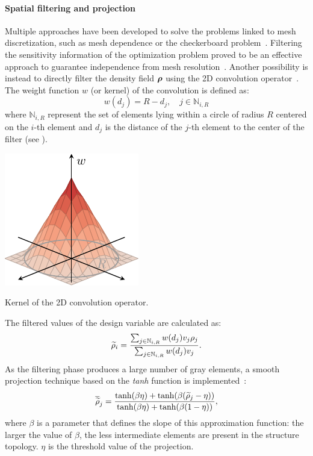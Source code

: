 \paragraph{Spatial filtering and projection} 
Multiple approaches have been developed to solve the problems linked to mesh discretization, such as mesh dependence or the checkerboard problem~. Filtering the sensitivity information of the optimization problem proved to be an effective approach to guarantee independence from mesh resolution~. Another possibility is instead to directly filter the density field $\bm{\rho}$ using the 2D convolution operator~. The weight function $w$ (or kernel) of the convolution is defined as:
\begin{equation}
    w(d_j) = R - d_j, \quad j \in \mathbb{N}_{i,R}
\end{equation} 
where $\mathbb{N}_{i,R}$ represent the set of elements lying within a circle of radius $R$ centered on the $i$-th element and $d_j$ is the distance of the $j$-th element to the center of the filter (see ).
\begin{marginfigure}
    \centering
    \includegraphics{figures/02_literature/02_circ_filter/filt_cir.pdf}
    \caption{Kernel of the 2D convolution operator.}
    \label{fig:02_ker}
\end{marginfigure} 
The filtered values of the design variable are calculated as:
\begin{equation}
    \widetilde{\rho}_i = \frac{\sum_{j \in \mathbb{N}_{i,R}} w(d_j)v_j\rho_j}{\sum_{j \in \mathbb{N}_{i,R}} w(d_j)v_j}.
    \label{eq:02_rhofil}
\end{equation}
As the filtering phase produces a large number of gray elements, a smooth projection technique based on the \textit{tanh} function is implemented~:
\begin{equation}
    \overline{\widetilde{\rho}}_j = \frac{\tanh(\beta\eta)+\tanh(\beta(\widetilde{\rho}_j - \eta))}{\tanh(\beta\eta)+\tanh(\beta(1 - \eta))},
    \label{eq:02_proj}
\end{equation}
where $\beta$ is a parameter that defines the slope of this approximation function: the larger the value of $\beta$, the less intermediate elements are present in the structure topology. $\eta$ is the threshold value of the projection.

